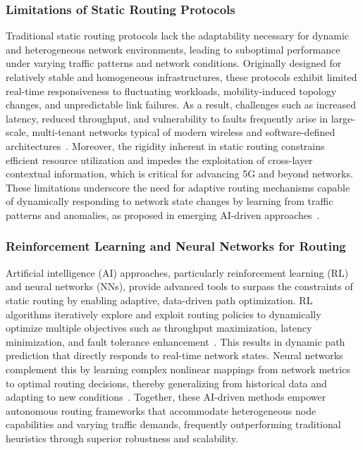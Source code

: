 \documentclass[sigconf]{acmart}
\begin{document}
\subsubsection{Limitations of Static Routing Protocols}

Traditional static routing protocols lack the adaptability necessary for dynamic and heterogeneous network environments, leading to suboptimal performance under varying traffic patterns and network conditions. Originally designed for relatively stable and homogeneous infrastructures, these protocols exhibit limited real-time responsiveness to fluctuating workloads, mobility-induced topology changes, and unpredictable link failures. As a result, challenges such as increased latency, reduced throughput, and vulnerability to faults frequently arise in large-scale, multi-tenant networks typical of modern wireless and software-defined architectures~\cite{ref53}. Moreover, the rigidity inherent in static routing constrains efficient resource utilization and impedes the exploitation of cross-layer contextual information, which is critical for advancing 5G and beyond networks. These limitations underscore the need for adaptive routing mechanisms capable of dynamically responding to network state changes by learning from traffic patterns and anomalies, as proposed in emerging AI-driven approaches~\cite{ref53}.

\subsubsection{Reinforcement Learning and Neural Networks for Routing}

Artificial intelligence (AI) approaches, particularly reinforcement learning (RL) and neural networks (NNs), provide advanced tools to surpass the constraints of static routing by enabling adaptive, data-driven path optimization. RL algorithms iteratively explore and exploit routing policies to dynamically optimize multiple objectives such as throughput maximization, latency minimization, and fault tolerance enhancement~\cite{ref4}. This results in dynamic path prediction that directly responds to real-time network states. Neural networks complement this by learning complex nonlinear mappings from network metrics to optimal routing decisions, thereby generalizing from historical data and adapting to new conditions~\cite{ref17}\textemdash\cite{ref20}. Together, these AI-driven methods empower autonomous routing frameworks that accommodate heterogeneous node capabilities and varying traffic demands, frequently outperforming traditional heuristics through superior robustness and scalability.
\end{document}
